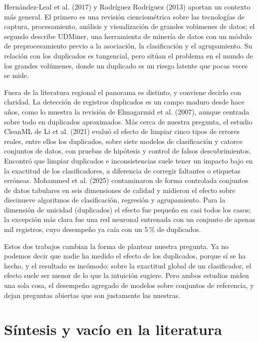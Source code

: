 \documentclass[11pt,openany,oneside,letterpaper]{book}
\begin{document}
Hernández-Leal et al. (2017) y Rodríguez Rodríguez (2013) aportan un contexto más general. El primero es una revisión cienciométrica sobre las tecnologías de captura, procesamiento, análisis y visualización de grandes volúmenes de datos; el segundo describe UDMiner, una herramienta de minería de datos con un módulo de preprocesamiento previo a la asociación, la clasificación y el agrupamiento. Su relación con los duplicados es tangencial, pero sitúan el problema en el mundo de los grandes volúmenes, donde un duplicado es un riesgo latente que pocas veces se mide.

Fuera de la literatura regional el panorama es distinto, y conviene decirlo con claridad. La detección de registros duplicados es un campo maduro desde hace años, como lo muestra la revisión de Elmagarmid et al. (2007), aunque centrada sobre todo en duplicados aproximados. Más cerca de nuestra pregunta, el estudio CleanML de Li et al. (2021) evaluó el efecto de limpiar cinco tipos de errores reales, entre ellos los duplicados, sobre siete modelos de clasificación y catorce conjuntos de datos, con pruebas de hipótesis y control de falsos descubrimientos. Encontró que limpiar duplicados e inconsistencias suele tener un impacto bajo en la exactitud de los clasificadores, a diferencia de corregir faltantes o etiquetas erróneas. Mohammed et al. (2025) contaminaron de forma controlada conjuntos de datos tabulares en seis dimensiones de calidad y midieron el efecto sobre diecinueve algoritmos de clasificación, regresión y agrupamiento. Para la dimensión de unicidad (duplicados) el efecto fue pequeño en casi todos los casos; la excepción más clara fue una red neuronal entrenada con un conjunto de apenas mil registros, cuyo desempeño ya caía con un 5\,\% de duplicados.

Estos dos trabajos cambian la forma de plantear nuestra pregunta. Ya no podemos decir que nadie ha medido el efecto de los duplicados, porque sí se ha hecho, y el resultado es incómodo: sobre la exactitud global de un clasificador, el efecto suele ser menor de lo que la intuición sugiere. Pero ambos estudios miden una sola cosa, el desempeño agregado de modelos sobre conjuntos de referencia, y dejan preguntas abiertas que son justamente las nuestras.

\section{Síntesis y vacío en la literatura}
\end{document}
